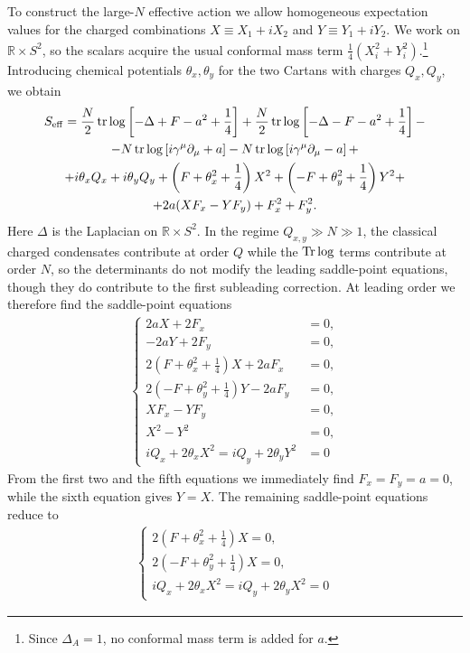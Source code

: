 \documentclass[a4paper,11pt]{article}
\begin{document}
To construct the large-$N$ effective action we allow homogeneous expectation values for the charged combinations $X\equiv X_1+iX_2$ and $Y\equiv Y_1+iY_2$. We work on $\mathbb R\times S^2$, so the scalars acquire the usual conformal mass term $\frac14(X_i^2+Y_i^2)$.\footnote{Since $\Delta_A=1$, no conformal mass term is added for $a$.} Introducing chemical potentials $\theta_x,\theta_y$ for the two Cartans with charges $Q_x,Q_y$, we obtain
\begin{gather}
    S_{\rm eff} = \frac{N}{2} \operatorname{tr}\log \left[-\Delta + F - a^2 + \frac14\right] + \frac{N}{2} \operatorname{tr}\log \left[-\Delta - F - a^2 + \frac14 \right] - \notag\\
    - N \operatorname{tr}\log\left[i \gamma^\mu \partial_\mu + a \right]  - N \operatorname{tr}\log\left[i \gamma^\mu \partial_\mu - a \right] + \notag\\
+    i \theta_x Q_x +  i \theta_y Q_y +  \left(F + \theta_x^2 + \frac14\right) X^2   +  \left(-F + \theta_y^2 + \frac14\right) Y^2 + \notag\\
    + 2 a (XF_x - Y F_y) + F_{x}^2 + F_{y}^2. \label{eq:son-Seff}
\end{gather}
Here $\Delta$ is the Laplacian on $\mathbb R\times S^2$. In the regime $Q_{x,y}\gg N\gg 1$, the classical charged condensates contribute at order $Q$ while the $\Tr\log$ terms contribute at order $N$, so the determinants do not modify the leading saddle-point equations, though they do contribute to the first subleading correction. At leading order we therefore find the saddle-point equations
\begin{gather}
\left\{
    \begin{matrix}
       2 a X + 2 F_{x} &= 0, \\
       -2 a Y + 2 F_y &= 0,\\
        2\left(F + \theta_x^2 + \frac14\right) X  +2 a F_x &= 0,\\
       2\left(-F + \theta_y^2 + \frac14\right) Y   - 2 a F_y &= 0,\\
       X F_x - Y F_y &= 0,\\
     X^2 - Y^2 &= 0, \\
     i Q_x + 2 \theta_x X^2 = i Q_y + 2\theta_y Y^2 &= 0
    \end{matrix}
\right.
\end{gather}
From the first two and the fifth equations we immediately find $F_x=F_y=a=0$, while the sixth equation gives $Y=X$. The remaining saddle-point equations reduce to
\begin{gather}
\left\{
    \begin{matrix}
        2\left(F + \theta_x^2 + \frac14\right) X = 0,\\
       2\left(-F + \theta_y^2 + \frac14\right) X  = 0,\\
     i Q_x + 2 \theta_x X^2 = i Q_y + 2\theta_y X^2 = 0
    \end{matrix}
\right.
\end{gather}
\end{document}
